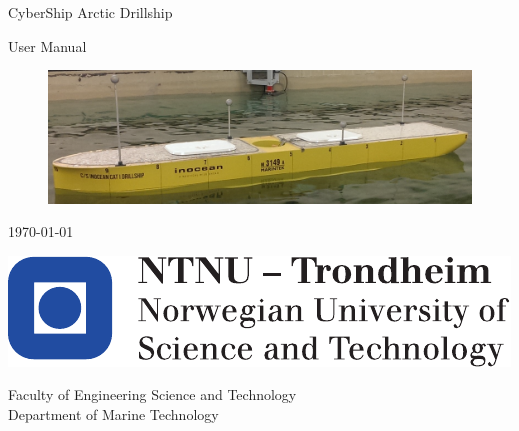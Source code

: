 \documentclass[12pt]{report}
\begin{document}
\thispagestyle{empty}

\vspace*{3cm}

\begin{center}
	{\LARGE{}CyberShip Arctic Drillship}
	\par\end{center}{\LARGE \par}

\begin{center}
	{\LARGE{}User Manual }
	\par\end{center}{\LARGE \par}

\begin{figure}[h!]
	\centering
	\includegraphics[width=\linewidth]{fig/CSAD_photo.png}
\end{figure}
\begin{center}
{\today }
\end{center}
\begin{flushleft}
	\vfill{}
	\par\end{flushleft}

\begin{flushleft}
	\includegraphics[scale=0.6]{fig/NTNU_logo.pdf}
	\par\end{flushleft}
Faculty of Engineering Science and Technology\\
Department of Marine Technology

\clearpage{}

\setcounter{page}{0}

\tableofcontents
\setcounter{page}{0}



\appendix


  
\end{document}
